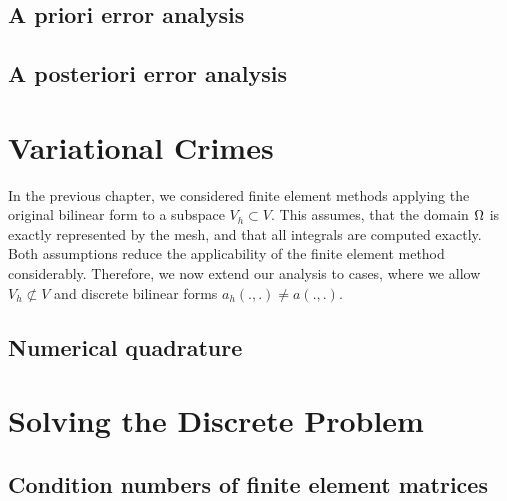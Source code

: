 \section{A priori error analysis}

\section{A posteriori error analysis}


\chapter{Variational Crimes}
\begin{intro}
  In the previous chapter, we considered finite element methods
  applying the original bilinear form to a subspace $V_h\subset
  V$. This assumes, that the domain $\Omega$ is exactly represented
  by the mesh, and that all integrals are computed exactly. Both
  assumptions reduce the applicability of the finite element method
  considerably. Therefore, we now extend our analysis to cases, where
  we allow $V_h \not\subset V$ and discrete bilinear forms
  $a_h(.,.) \neq a(.,.)$.
\end{intro}

\section{Numerical quadrature}


\chapter{Solving the Discrete Problem}




\section{Condition numbers of finite element matrices}



%

%
%



\printindex

